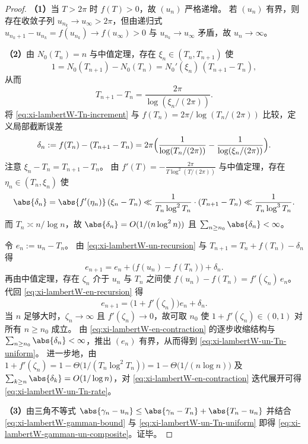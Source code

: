 \begin{proof}
\textbf{（1）}当 \(T>2\pi\) 时 \(f(T)>0\)，故 \((u_n)\) 严格递增。
若 \((u_n)\) 有界，则存在收敛子列 \(u_{n_k}\to u_\infty>2\pi\)，但由递归式
\(
u_{n_k+1}-u_{n_k}=f(u_{n_k})\to f(u_\infty)>0
\)
与 \(u_{n_k}\to u_\infty\) 矛盾，故 \(u_n\to\infty\)。
\par
\textbf{（2）}由 \(N_0(T_n)=n\) 与中值定理，存在 \(\xi_n\in(T_n,T_{n+1})\) 使
\[
1=N_0(T_{n+1})-N_0(T_n)=N_0'(\xi_n)\,(T_{n+1}-T_n),
\]
从而
\begin{equation}\label{eq:xi-lambertW-Tn-increment}
T_{n+1}-T_n=\frac{2\pi}{\log(\xi_n/(2\pi))}.
\end{equation}
将 \eqref{eq:xi-lambertW-Tn-increment} 与 \(f(T_n)=2\pi/\log(T_n/(2\pi))\) 比较，定义局部截断误差
\[
\delta_n:=f(T_n)-(T_{n+1}-T_n)
=2\pi\Bigl(\frac{1}{\log(T_n/(2\pi))}-\frac{1}{\log(\xi_n/(2\pi))}\Bigr).
\]
注意 \(\xi_n-T_n=T_{n+1}-T_n\)。
由 \(f'(T)=-\frac{2\pi}{T\log^2(T/(2\pi))}\) 与中值定理，存在 \(\eta_n\in(T_n,\xi_n)\) 使
\[
\abs{\delta_n}=\abs{f'( \eta_n)}\,(\xi_n-T_n)
\ll
\frac{1}{T_n\log^2 T_n}\cdot (T_{n+1}-T_n)
\ll
\frac{1}{T_n\log^3 T_n}.
\]
而 \(T_n\asymp n/\log n\)，故 \(\abs{\delta_n}=O(1/(n\log^2 n))\) 且 \(\sum_{n\ge n_0}\abs{\delta_n}<\infty\)。
\par
令 \(e_n:=u_n-T_n\)。
由 \eqref{eq:xi-lambertW-un-recursion} 与 \(T_{n+1}=T_n+f(T_n)-\delta_n\) 得
\begin{equation}\label{eq:xi-lambertW-en-recursion}
e_{n+1}=e_n+\bigl(f(u_n)-f(T_n)\bigr)+\delta_n.
\end{equation}
再由中值定理，存在 \(\zeta_n\) 介于 \(u_n\) 与 \(T_n\) 之间使
\(
f(u_n)-f(T_n)=f'(\zeta_n)\,e_n
\)。
代回 \eqref{eq:xi-lambertW-en-recursion} 得
\begin{equation}\label{eq:xi-lambertW-en-contraction}
e_{n+1}=\bigl(1+f'(\zeta_n)\bigr)e_n+\delta_n.
\end{equation}
当 \(n\) 足够大时，\(\zeta_n\to\infty\) 且 \(f'(\zeta_n)\to 0\)，故可取 \(n_0\) 使 \(1+f'(\zeta_n)\in(0,1)\) 对所有 \(n\ge n_0\) 成立。
由 \eqref{eq:xi-lambertW-en-contraction} 的逐步收缩结构与 \(\sum_{n\ge n_0}\abs{\delta_n}<\infty\)，推出 \((e_n)\) 有界，从而得到 \eqref{eq:xi-lambertW-un-Tn-uniform}。
进一步地，由
\(
1+f'(\zeta_n)=1-\Theta\!\bigl(1/(T_n\log^2 T_n)\bigr)
=1-\Theta\!\bigl(1/(n\log n)\bigr)
\)
及 \(\sum_{k\ge n}\abs{\delta_k}=O(1/\log n)\)，对 \eqref{eq:xi-lambertW-en-contraction} 迭代展开可得 \eqref{eq:xi-lambertW-un-Tn-rate}。
\par
\textbf{（3）}由三角不等式
\(
\abs{\gamma_n-u_n}\le \abs{\gamma_n-T_n}+\abs{T_n-u_n}
\)
并结合 \eqref{eq:xi-lambertW-gamman-bound} 与 \eqref{eq:xi-lambertW-un-Tn-uniform} 即得 \eqref{eq:xi-lambertW-gamman-un-composite}。证毕。
\end{proof}

